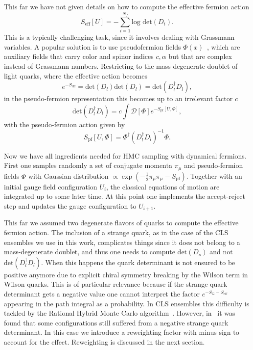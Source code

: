 This far we have not given details on how to compute the effective fermion action
\begin{equation}
S_{\textrm{eff}}[U]=-\sum_{i=1}^{N_f}\textrm{log det}(D_i).
\end{equation}
This is a typically challenging task, since it involves dealing with Grassmann variables. A popular solution is to use pseudofermion fields $\Phi(x)$~\citep{Weingarten:1980hx}, which are auxiliary fields that carry color and spinor indices $c,\alpha$ but that are complex instead of Grassmann numbers. Restricting to the mass-degenerate doublet of light quarks, where the effective action becomes
\begin{equation}
e^{-S_{\textrm{eff}}}=\textrm{det}(D_l)\textrm{det}(D_l)=\textrm{det}(D_l^{\dagger}D_l),
\end{equation}
in the pseudo-fermion representation this becomes up to an irrelevant factor $c$
\begin{equation}
\textrm{det}(D_l^{\dagger}D_l)=c\int\mathcal{D}[\Phi]e^{-S_{\textrm{pf}}[U,\Phi]},
\end{equation}
with the pseudo-fermion action given by
\begin{equation}
S_{\textrm{pf}}[U,\Phi]=\Phi^{\dagger}\left(D_l^{\dagger}D_l\right)^{-1}\Phi.
\end{equation}

Now we have all ingredients needed for HMC sampling with dynamical fermions. First one samples randomly a set of conjugate momenta $\pi_{\mu}$ and pseudo-fermion fields $\Phi$ with Gaussian distribution $\propto\exp\left(-\frac{1}{2}\pi_{\mu}\pi_{\mu}-S_{\textrm{pf}}\right)$. Together with an initial gauge field configuration $U_{i}$, the classical equations of motion are integrated up to some later time. At this point one implements the accept-reject step and updates the gauge configuration to $U_{i+1}$.

This far we assumed two degenerate flavors of quarks to compute the effective fermion action. The inclusion of a strange quark, as in the case of the CLS ensembles we use in this work, complicates things since it does not belong to a mass-degenerate doublet, and thus one needs to compute $\textrm{det}(D_s)$ and not $\textrm{det}(D_l^{\dagger}D_l)$. When this happens the quark determinant is not ensured to be positive anymore due to explicit chiral symmetry breaking by the Wilson term in Wilson quarks. This is of particular relevance because if the strange quark determinant gets a negative value one cannot interpret the factor $e^{-S_{\textrm{G}}-S_{\textrm{eff}}}$ appearing in the path integral as a probability. In CLS ensembles this difficulty is tackled by the Rational Hybrid Monte Carlo algorithm~\citep{Kennedy:1998cu,Clark:2006fx}. However, in~\citep{Mohler:2020txx} it was found that some configurations still suffered from a negative strange quark determinant. In this case we introduce a reweighting factor with minus sign to account for the effect. Reweighting is discussed in the next section.

